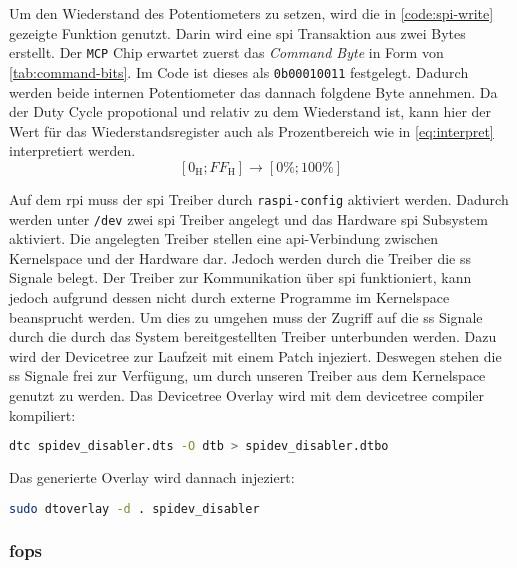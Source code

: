 Um den Wiederstand des Potentiometers zu setzen, wird die in \autoref{code:spi-write} gezeigte Funktion genutzt.
Darin wird eine \gls{spi} Transaktion aus zwei Bytes erstellt.
Der \texttt{MCP} Chip erwartet zuerst das \textit{Command Byte} in Form von \autoref{tab:command-bits}.
Im Code ist dieses als \texttt{0b00010011} festgelegt.
Dadurch werden beide internen Potentiometer das dannach folgdene Byte annehmen.
Da der Duty Cycle propotional und relativ zu dem Wiederstand ist, kann hier der Wert für das Wiederstandsregister auch als Prozentbereich wie in \autoref{eq:interpret} interpretiert werden.
\begin{equation}
    \left[0_{\text{H}}; FF_{\text{H}}\right] \rightarrow \left[0\%; 100\%\right]
    \label{eq:interpret}
\end{equation}



Auf dem \gls{rpi} muss der \gls{spi} Treiber durch \texttt{raspi-config} aktiviert werden.
Dadurch werden unter \texttt{/dev} zwei \gls{spi} Treiber angelegt und das Hardware \gls{spi} Subsystem aktiviert.
Die angelegten Treiber stellen eine \gls{api}-Verbindung zwischen Kernelspace und der Hardware dar.
Jedoch werden durch die Treiber die \gls{ss} Signale belegt.
Der Treiber zur Kommunikation über \gls{spi} funktioniert, kann jedoch aufgrund dessen nicht durch externe Programme im Kernelspace beansprucht werden.
Um dies zu umgehen muss der Zugriff auf die \gls{ss} Signale durch die durch das System bereitgestellten Treiber unterbunden werden.
Dazu wird der Devicetree zur Laufzeit mit einem Patch injeziert.
Deswegen stehen die \gls{ss} Signale frei zur Verfügung, um durch unseren Treiber aus dem Kernelspace genutzt zu werden.
Das Devicetree Overlay wird mit dem devicetree compiler kompiliert:
\begin{lstlisting}[language=bash, numbers=none]
dtc spidev_disabler.dts -O dtb > spidev_disabler.dtbo
\end{lstlisting}
\noindent
Das generierte Overlay wird dannach injeziert:
\begin{lstlisting}[language=bash, numbers=none]
sudo dtoverlay -d . spidev_disabler
\end{lstlisting}

\subsubsection{\acrshort{fops}}

